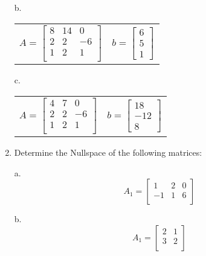\documentclass[12pt]{article}
\begin{document}
\begin{enumerate}
b. 
  \begin{center}
    \begin{tabular}{cc}
      $
      A = \left[\begin{array}{ccc}
                  8 & 14 & 0 \\
                  2 & 2 & -6 \\
                  1 & 2 & 1  \\
                \end{array}\right]
      $ &
      $ 
          b = \left[\begin{array}{c}
                      6 \\ 5 \\ 1
                    \end{array}\right]
      $
    \end{tabular}
  \end{center}

c. 
  \begin{center}
    \begin{tabular}{cc}
      $
      A = \left[\begin{array}{ccc} 4 & 7 & 0 \\ 2 & 2 & -6\\1 & 2 & 1\\\end{array}\right]
      $ &
      $ 
          b = \left[\begin{array}{c} 18 \\ -12 \\ 8 \end{array}\right]
      $
    \end{tabular}
  \end{center}
  
\item Determine  the Nullspace of the following matrices:

a.
\[
A_1 = \left[\begin{array}{ccc} 1 & 2 & 0\\ -1 & 1 & 6 \\  \end{array}\right]
\]

b.
\[
A_1 = \left[\begin{array}{cc} 2 & 1\\ 3 & 2\\  \end{array}\right]
\]



\end{enumerate}
\end{document}
